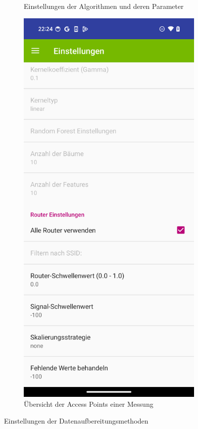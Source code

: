 \begin{figure}[h!]
\begin{subfigure}[b]{0.3\textwidth}
        \caption{Einstellungen der Algorithmen und deren Parameter}
        \label{fig:app-localize-2}
    \end{subfigure}
    \hfill
    \begin{subfigure}[b]{0.3\textwidth}
        \centering
        \includegraphics[width=\textwidth]{images/screenshots/settings_2.png}
        \caption{Übersicht der Access Points einer Messung}
        \label{fig:app-localize-3}
    \end{subfigure}
    \caption{Einstellungen der Datenaufbereitungsmethoden}
    \label{fig:app-localize-4}
\end{figure}


